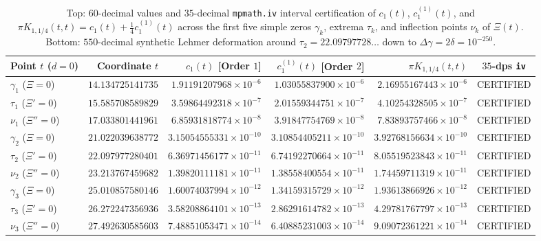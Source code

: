 \documentclass[11pt,reqno]{amsart}
\theoremstyle{definition}
\theoremstyle{remark}
\numberwithin{equation}{section}
\begin{document}
\begin{table}[t]
\centering
\caption{Top: $60$-decimal values and $35$-decimal \texttt{mpmath.iv} interval certification of $c_1(t)$, $c_1^{(1)}(t)$, and $\pi K_{1,1/4}(t,t) = c_1(t) + \frac{1}{4}c_1^{(1)}(t)$ across the first five simple zeros $\gamma_k$, extrema $\tau_k$, and inflection points $\nu_k$ of $\Xi(t)$. Bottom: $550$-decimal synthetic Lehmer deformation around $\tau_2 = 22.09797728\dots$ down to $\Delta\gamma = 2\delta = 10^{-250}$.}\label{tab:lehmer_interlocking}
\scriptsize
\setlength{\tabcolsep}{3.0pt}
\begin{tabular}{@{}lrrrrc@{}}
\toprule
Point $t$ ($d = 0$) & Coordinate $t$ & $c_1(t)$ [Order $1$] & $c_1^{(1)}(t)$ [Order $2$] & $\pi K_{1,1/4}(t,t)$ & $35$-dps \texttt{iv} \\
\midrule
$\gamma_1$ ($\Xi=0$)   & $14.134725141735$ & $1.91191207968\times 10^{-6}$  & $1.03055837900\times 10^{-6}$  & $2.16955167443\times 10^{-6}$  & CERTIFIED \\
$\tau_1$ ($\Xi'=0$)    & $15.585708589829$ & $3.59864492318\times 10^{-7}$  & $2.01559344751\times 10^{-7}$  & $4.10254328505\times 10^{-7}$  & CERTIFIED \\
$\nu_1$ ($\Xi''=0$)    & $17.033801441961$ & $6.85931818774\times 10^{-8}$  & $3.91847754769\times 10^{-8}$  & $7.83893757466\times 10^{-8}$  & CERTIFIED \\
$\gamma_2$ ($\Xi=0$)   & $21.022039638772$ & $3.15054555331\times 10^{-10}$ & $3.10854405211\times 10^{-10}$ & $3.92768156634\times 10^{-10}$ & CERTIFIED \\
$\tau_2$ ($\Xi'=0$)    & $22.097977280401$ & $6.36971456177\times 10^{-11}$ & $6.74192270664\times 10^{-11}$ & $8.05519523843\times 10^{-11}$ & CERTIFIED \\
$\nu_2$ ($\Xi''=0$)    & $23.213767459682$ & $1.39820111181\times 10^{-11}$ & $1.38558400554\times 10^{-11}$ & $1.74459711319\times 10^{-11}$ & CERTIFIED \\
$\gamma_3$ ($\Xi=0$)   & $25.010857580146$ & $1.60074037994\times 10^{-12}$ & $1.34159315729\times 10^{-12}$ & $1.93613866926\times 10^{-12}$ & CERTIFIED \\
$\tau_3$ ($\Xi'=0$)    & $26.272247356936$ & $3.58208864101\times 10^{-13}$ & $2.86291614782\times 10^{-13}$ & $4.29781767797\times 10^{-13}$ & CERTIFIED \\
$\nu_3$ ($\Xi''=0$)    & $27.492630585603$ & $7.48851053471\times 10^{-14}$ & $6.40885231003\times 10^{-14}$ & $9.09072361221\times 10^{-14}$ & CERTIFIED \\

\end{tabular}
\end{table}
\end{document}
